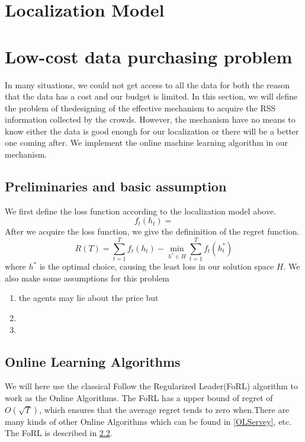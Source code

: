 \documentclass[10pt,conference,compsocconf,letterpaper]{IEEEtran}
\begin{document}
\section{Localization Model}

\section{Low-cost data purchasing problem}
 In many situations, we could not get access to all the data for both the reason that the data has a cost and our budget is limited. In this section, we will define the problem of thedesigning of the effective mechanism to acquire the RSS information collected by the crowds. However, the mechanism have no means to know either the data is good enough for our localization or there will be a better one coming after. We implement the online machine learning algorithm in our mechanism.
\subsection{Preliminaries and basic assumption}
We first define the loss function according to the localization model above.
\begin{equation}
f_t(h_t)=
\end{equation}
 After we acquire the loss function, we give the defininition of the regret function.
\[R(T)=\sum_{t=1}^Tf_t(h_t)-\min_{h^*\in H}\sum_{t=1}^Tf_t(h^*_t)\]
where $h^*$ is the optimal choice, causing the least loss in our solution space $H$.
We also make some assumptions for this problem
\begin{enumerate}
\item the agents may lie about the price but 
\item 
\item 
\end{enumerate}
\subsection{Online Learning Algorithms}
We will here use the classical Follow the Regularized Leader(FoRL) algorithm to work as the Online Algorithms. The FoRL has a upper bound of regret of $O(\sqrt{T})$, which ensures that the average regret tends to zero when.There are many kinds of other Online Algorithms which can be found in \ref{OLServey}, etc. The FoRL is described in \ref{}.
\begin{algorithm}
\end{algorithm}
\end{document}
